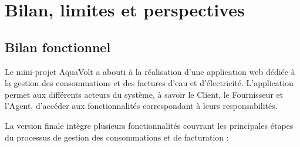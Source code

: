 
\chapter{Bilan, limites et perspectives}
\label{chap:bilan}

\section{Bilan fonctionnel}

Le mini-projet AquaVolt a abouti à la réalisation d'une application web dédiée à la gestion des consommations et des factures d'eau et d'électricité. L'application permet aux différents acteurs du système, à savoir le Client, le Fournisseur et l'Agent, d'accéder aux fonctionnalités correspondant à leurs responsabilités.

La version finale intègre plusieurs fonctionnalités couvrant les principales étapes du processus de gestion des consommations et de facturation :

